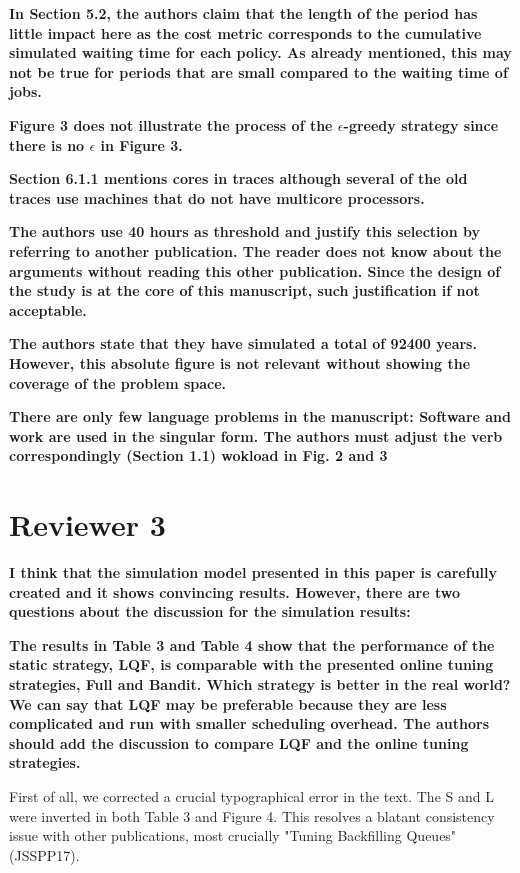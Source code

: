 \documentclass[]{article}
\begin{document}
\textbf{In Section 5.2, the authors claim that the length of the period has little impact here as the cost metric corresponds
to the cumulative simulated waiting time for each policy. As already mentioned, this may not be true for periods that
are small compared to the waiting time of jobs.
}

\textbf{Figure 3 does not illustrate the process of the $\epsilon$-greedy strategy since there is no $\epsilon$ in Figure 3.
}

\textbf{Section 6.1.1 mentions cores in traces although several of the old traces use machines that do not have multicore
processors.
}

\textbf{The authors use 40 hours as threshold and justify this selection by referring to another publication. The reader does
not know about the arguments without reading this other publication. Since the design of the study is at the core of
this manuscript, such justification if not acceptable.
}

\textbf{The authors state that they have simulated a total of 92400 years. However, this absolute figure is not relevant
without showing the coverage of the problem space.
}

\textbf{There are only few language problems in the manuscript:
Software and work are used in the singular form. The authors must adjust the verb correspondingly (Section 1.1)
wokload in Fig. 2 and 3
}



\section{Reviewer 3}

\textbf{I think that the simulation model presented in this paper is carefully created and it shows convincing results.
However, there are two questions about the discussion for the simulation results:
}

\textbf{The results in Table 3 and Table 4 show that the performance of the static strategy, LQF, is comparable with the
presented online tuning strategies, Full and Bandit. Which strategy is better in the real world? We can say that LQF
may be preferable because they are less complicated and run with smaller scheduling overhead. The authors should add
the discussion to compare LQF and the online tuning strategies.
}

First of all, we corrected a crucial typographical error in the text. The S and
L were inverted in both Table 3 and Figure 4. This resolves a blatant
consistency issue with other publications, most crucially "Tuning Backfilling
Queues"(JSSPP17).
\end{document}
